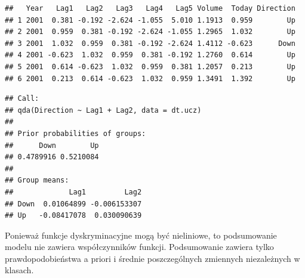 \documentclass[]{book}
\newenvironment{Shaded}{\begin{snugshade}}{\end{snugshade}}
\newcommand{\DataTypeTok}[1]{\textcolor[rgb]{0.13,0.29,0.53}{#1}}
\newcommand{\DecValTok}[1]{\textcolor[rgb]{0.00,0.00,0.81}{#1}}
\newcommand{\KeywordTok}[1]{\textcolor[rgb]{0.13,0.29,0.53}{\textbf{#1}}}
\newcommand{\NormalTok}[1]{#1}
\newcommand{\OperatorTok}[1]{\textcolor[rgb]{0.81,0.36,0.00}{\textbf{#1}}}
\newcommand{\StringTok}[1]{\textcolor[rgb]{0.31,0.60,0.02}{#1}}
\theoremstyle{plain}
\theoremstyle{definition}
\theoremstyle{definition}
\theoremstyle{definition}
\theoremstyle{definition}
\theoremstyle{remark}
\begin{document}
\begin{verbatim}
##   Year   Lag1   Lag2   Lag3   Lag4   Lag5 Volume  Today Direction
## 1 2001  0.381 -0.192 -2.624 -1.055  5.010 1.1913  0.959        Up
## 2 2001  0.959  0.381 -0.192 -2.624 -1.055 1.2965  1.032        Up
## 3 2001  1.032  0.959  0.381 -0.192 -2.624 1.4112 -0.623      Down
## 4 2001 -0.623  1.032  0.959  0.381 -0.192 1.2760  0.614        Up
## 5 2001  0.614 -0.623  1.032  0.959  0.381 1.2057  0.213        Up
## 6 2001  0.213  0.614 -0.623  1.032  0.959 1.3491  1.392        Up
\end{verbatim}

\begin{Shaded}
\end{Shaded}

\begin{verbatim}
## Call:
## qda(Direction ~ Lag1 + Lag2, data = dt.ucz)
## 
## Prior probabilities of groups:
##      Down        Up 
## 0.4789916 0.5210084 
## 
## Group means:
##             Lag1         Lag2
## Down  0.01064899 -0.006153307
## Up   -0.08417078  0.030090639
\end{verbatim}

Ponieważ funkcje dyskryminacyjne mogą być nieliniowe, to podsumowanie modelu nie zawiera współczynników funkcji. Podsumowanie zawiera tylko prawdopodobieństwa a priori i średnie poszczególnych zmiennych niezależnych w klasach.

\begin{Shaded}
\end{Shaded}
\end{document}
